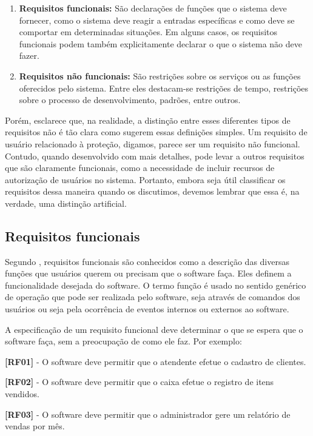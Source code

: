 \begin{enumerate}
	\item \textbf{Requisitos funcionais:} São declarações de funções que o sistema deve fornecer, como o sistema deve reagir a entradas específicas e como deve se comportar em determinadas situações. Em alguns casos, os requisitos funcionais podem também explicitamente declarar o que o sistema não deve fazer.
	\item \textbf{Requisitos não funcionais:} São restrições sobre os serviços ou as funções oferecidos pelo sistema. Entre eles destacam-se restrições de tempo, restrições sobre o processo de desenvolvimento, padrões, entre outros.
\end{enumerate}

Porém,  esclarece que, na realidade, a distinção entre esses diferentes tipos de requisitos não é tão clara como sugerem essas definições simples. Um requisito de usuário relacionado à proteção, digamos, parece ser um requisito não funcional. Contudo, quando desenvolvido com mais detalhes, pode levar a outros requisitos que são claramente funcionais, como a necessidade de incluir recursos de autorização de usuários no sistema. Portanto, embora seja útil classificar os requisitos dessa maneira quando os discutimos, devemos lembrar que essa é, na verdade, uma distinção artificial. 

\subsection{Requisitos funcionais}

Segundo , requisitos funcionais são conhecidos como a descrição das diversas funções que usuários querem ou precisam que o software faça. Eles definem a funcionalidade desejada do software. O termo função é usado no sentido genérico de operação que pode ser realizada pelo software, seja através de comandos dos usuários ou seja pela ocorrência de eventos internos ou externos ao software.

A especificação de um requisito funcional deve determinar o que se espera que o software faça, sem a preocupação de como ele faz. Por exemplo: 

\textbf{[RF01]} - O software deve permitir que o atendente efetue o cadastro de clientes.

\textbf{[RF02]} - O software deve permitir que o caixa efetue o registro de itens vendidos.

\textbf{[RF03]} - O software deve permitir que o administrador gere um relatório de vendas por mês.

